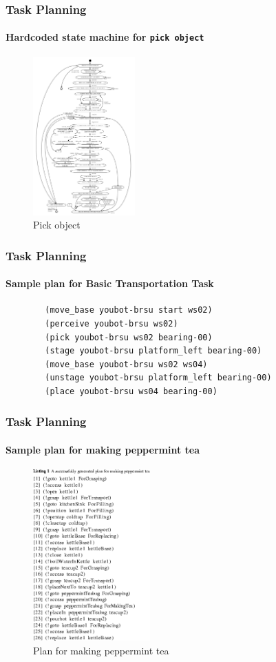 \documentclass{beamer}
\begin{document}
\begin{frame}
\frametitle{Task Planning}
\framesubtitle{Hardcoded state machine for \texttt{pick object}}
\begin{figure}[H]
     \centering
     \includegraphics[width=0.35\textwidth]{images/Pick.png}
     \caption{Pick object~\cite{Lima}}
     \label{fig:pick}
\end{figure}
\end{frame}

\begin{frame}[fragile]
\frametitle{Task Planning}
\framesubtitle{Sample plan for Basic Transportation Task}
    \begin{verbatim}
        (move_base youbot-brsu start ws02)
        (perceive youbot-brsu ws02)
        (pick youbot-brsu ws02 bearing-00)
        (stage youbot-brsu platform_left bearing-00)
        (move_base youbot-brsu ws02 ws04)
        (unstage youbot-brsu platform_left bearing-00)
        (place youbot-brsu ws04 bearing-00)
    \end{verbatim}
\end{frame}

\begin{frame}
\frametitle{Task Planning}
\framesubtitle{Sample plan for making peppermint tea}
\begin{figure}[H]
     \centering
     \includegraphics[width=0.4\textwidth]{images/bring_me_tea.png}
     \caption{Plan for making peppermint tea~\cite{Awaad}}
     \label{fig:tea}
\end{figure}
\end{frame}
\end{document}
